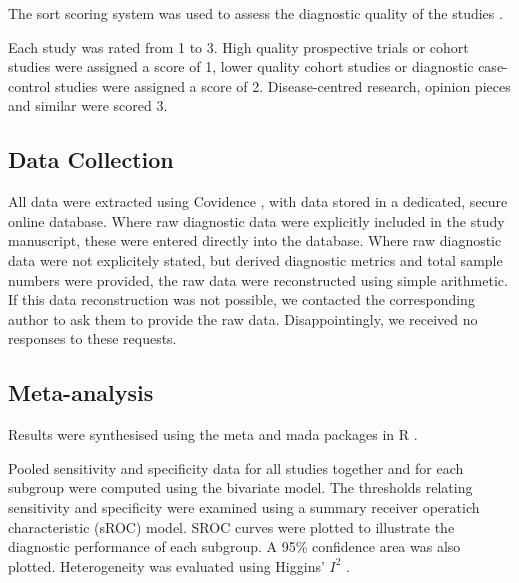 
The \gls{sort}  scoring system was used to assess the diagnostic quality of the studies \cite{ebellStrengthRecommendationTaxonomy2004}.

Each study was rated from 1 to 3. 
High quality prospective trials or cohort studies were assigned a score of 1, lower quality cohort studies or diagnostic case-control studies were assigned a score of 2. 
Disease-centred research, opinion pieces and similar were scored 3.

\subsection{Data Collection}

All data were extracted using Covidence \cite{Covidence}, with data stored in a dedicated, secure online database.
Where raw diagnostic data were explicitly included in the study manuscript, these were entered directly into the database.
Where raw diagnostic data were not explicitely stated, but derived diagnostic metrics and total sample numbers were provided, the raw data were reconstructed using simple arithmetic.
If this data reconstruction was not possible, we contacted the corresponding author to ask them to provide the raw data. 
Disappointingly, we received no responses to these requests.




\subsection{Meta-analysis}

Results were synthesised using the meta \cite{balduzziHowPerformMetaanalysis2019} and mada \cite{doeblerMadaMetaAnalysisDiagnostic2020} packages in R \cite{r-core}. 

Pooled sensitivity and specificity data for all studies together and for each subgroup were computed using the bivariate model.
The thresholds relating sensitivity and specificity were examined using a summary receiver operatich characteristic (sROC) model.
SROC curves were plotted to illustrate the diagnostic performance of each subgroup.
A 95\% confidence area was also plotted.
Heterogeneity was evaluated using Higgins' $I^2$ \cite{higginsQuantifyingHeterogeneityMetaanalysis2002}.
